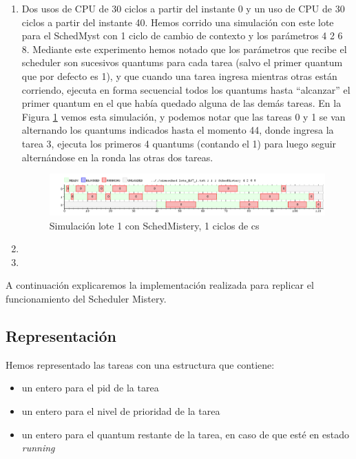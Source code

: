 \begin{enumerate}
\item Dos usos de CPU de 30 ciclos a partir del instante 0 y un uso de CPU de 30 ciclos a partir del instante 40.  Hemos corrido una simulación con este lote para el SchedMyst con 1 ciclo de cambio de contexto y los parámetros 4 2 6 8. Mediante este experimento hemos notado que los parámetros que recibe el scheduler son sucesivos quantums para cada tarea (salvo el primer quantum que por defecto es 1), y que cuando una tarea ingresa mientras otras están corriendo, ejecuta en forma secuencial todos los quantums hasta ``alcanzar'' el primer quantum en el que había quedado alguna de las demás tareas. En la Figura \ref{fig-1} vemos esta simulación, y podemos notar que las tareas 0 y 1 se van alternando los quantums indicados hasta el momento 44, donde ingresa la tarea 3, ejecuta los primeros 4 quantums (contando el 1) para luego seguir alternándose en la ronda las otras dos tareas.

\begin{figure}[!htb]
\begin{center}
  \includegraphics[scale=0.45]{imagenes/ej7-1.png}
\end{center}
\caption{Simulación lote 1 con SchedMistery, 1 ciclos de cs}\label{fig-1}
\end{figure}

\item 
\item 
\end{enumerate}

A continuación explicaremos la implementación realizada para replicar el funcionamiento del Scheduler Mistery.

\subsection{Representación}

Hemos representado las tareas con una estructura que contiene:

\begin{itemize}
\item un entero para el pid de la tarea
\item un entero para el nivel de prioridad de la tarea
\item un entero para el quantum restante de la tarea, en caso de que esté en estado {\it running}
\end{itemize}

